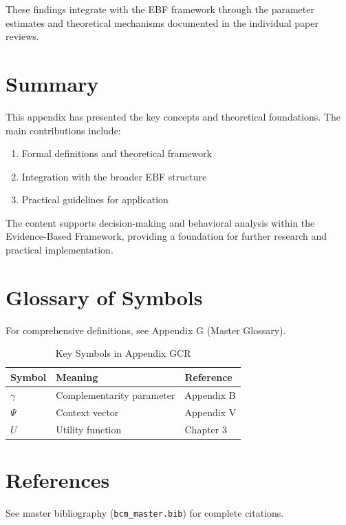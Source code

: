 \documentclass[11pt]{article}
\begin{document}
These findings integrate with the EBF framework through the parameter estimates
and theoretical mechanisms documented in the individual paper reviews.

\section{Summary}
\label{sec:gcr-summary}

This appendix has presented the key concepts and theoretical foundations.
The main contributions include:

\begin{enumerate}
    \item Formal definitions and theoretical framework
    \item Integration with the broader EBF structure
    \item Practical guidelines for application
\end{enumerate}

The content supports decision-making and behavioral analysis within the
Evidence-Based Framework, providing a foundation for further research
and practical implementation.


\section{Glossary of Symbols}
\label{sec:gcr-glossary}

For comprehensive definitions, see Appendix G (Master Glossary).

\begin{table}[htbp]
\centering
\caption{Key Symbols in Appendix GCR}
\begin{tabular}{lll}
\toprule
\textbf{Symbol} & \textbf{Meaning} & \textbf{Reference} \\
\midrule
$\gamma$ & Complementarity parameter & Appendix B \\
$\Psi$ & Context vector & Appendix V \\
$U$ & Utility function & Chapter 3 \\
\bottomrule
\end{tabular}
\end{table}


\section{References}
\label{sec:references}

See master bibliography (\texttt{bcm\_master.bib}) for complete citations.

\nocite{bcm_master}
\end{document}
